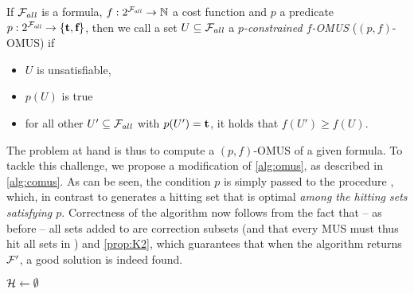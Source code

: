 \begin{definition}
    If $\mathcal{F} _{\mathit{all}}$ is a formula, $f:2^{\mathcal{F} _{\mathit{all}}} \to \mathbb{N}$ a cost function and  $p$ a predicate $p: 2^{\mathcal{F} _{\mathit{all}}}\to \{\textbf{t},\textbf{f}\}$, then we call a set $U\subseteq \mathcal{F} _{\mathit{all}}$ a \emph{$p$-constrained $f$-OMUS} ($(p,f)$-OMUS) if \begin{itemize}                                                                                                                                                                                                                         
    \item $U$ is unsatisfiable,
    \item $p(U)$ is true
    \item for all other $U'\subseteq \mathcal{F} _{\mathit{all}}$ with $p(U')=\textbf{t}$, it holds that $f(U')\geq f(U)$.                                                                                                                                                                                                                         \end{itemize}
\end{definition}

The problem at hand is thus to compute a $(p,f)$-OMUS of a given formula. 
To tackle this challenge, we propose a modification of \cref{alg:omus}, as described in \cref{alg:comus}. 
As can be seen, the condition $p$ is simply passed to the procedure \cohs, which, in contrast to \ohs generates a hitting set that is optimal \emph{among the hitting sets satisfying $p$}. Correctness of the algorithm now follows from the fact that -- as before -- all sets added to \setstohit are correction subsets (and that every MUS must thus hit all sets in \setstohit) and \cref{prop:K2}, which guarantees that when the algorithm returns $\mathcal{F} '$, a good solution is indeed found.  

\begin{algorithm}[ht]
  \DontPrintSemicolon
  $\mathcal{H}   \gets \emptyset$ \; %
  \caption{$\comus(\formula,f,p)$ }
  \label{alg:comus}
\end{algorithm}


